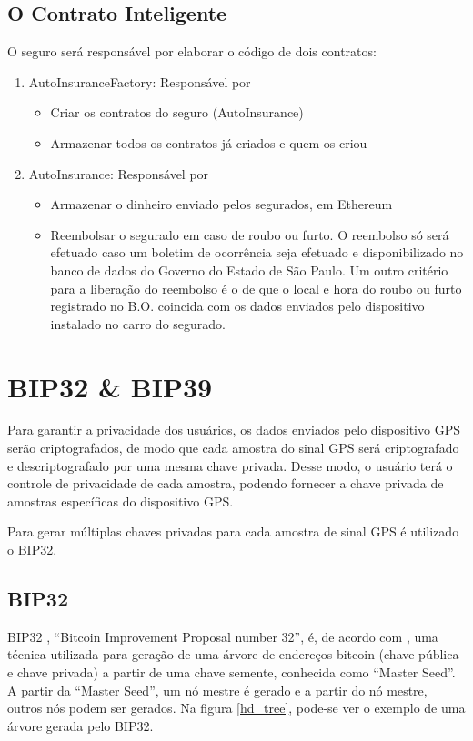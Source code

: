 \subsection{O Contrato Inteligente}

O seguro será responsável por elaborar o código de dois contratos:

\begin{enumerate}
\item AutoInsuranceFactory: Responsável por
	\begin{itemize}
	\item Criar os contratos do seguro (AutoInsurance)
    \item Armazenar todos os contratos já criados e quem os criou
	\end{itemize}
\item AutoInsurance: Responsável por
	\begin{itemize}
	\item Armazenar o dinheiro enviado pelos segurados, em Ethereum
    \item Reembolsar o segurado em caso de roubo ou furto. O reembolso só será efetuado caso um boletim de ocorrência seja efetuado e disponibilizado no banco de dados do Governo do Estado de São Paulo. Um outro critério para a liberação do reembolso é o de que o local e hora do roubo ou furto registrado no B.O. coincida com os dados enviados pelo dispositivo instalado no carro do segurado.
	\end{itemize}
\end{enumerate}

\section{BIP32 \& BIP39}

Para garantir a privacidade dos usuários, os dados enviados pelo dispositivo GPS serão criptografados, de modo que cada amostra do sinal GPS será criptografado e descriptografado por uma mesma chave privada. Desse modo, o usuário terá o controle de privacidade de cada amostra, podendo fornecer a chave privada de amostras específicas do dispositivo GPS.

Para gerar múltiplas chaves privadas para cada amostra de sinal GPS é utilizado o BIP32.

\subsection{BIP32}

BIP32 \cite{github_bip32}, ``Bitcoin Improvement Proposal number 32'', é, de acordo com \cite{deployability_bitcoin_bip32}, uma técnica utilizada para geração de uma árvore de endereços bitcoin (chave pública e chave privada) a partir de uma chave semente, conhecida como ``Master Seed''. A partir da ``Master Seed'', um nó mestre é gerado e a partir do nó mestre, outros nós podem ser gerados. Na figura \ref{hd_tree}, pode-se ver o exemplo de uma árvore gerada pelo BIP32.

